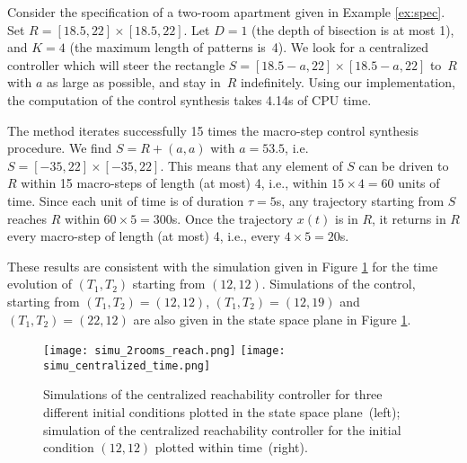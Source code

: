 \begin{example}
\label{ex:ex2}
Consider the specification of a two-room apartment given in Example
\ref{ex:spec}. Set $R=[18.5,22]\times[18.5,22]$.
Let $D=1$ (the depth of bisection is at most 1),
and $K=4$ (the maximum length of patterns is~4).
We look for a centralized controller which will steer
the rectangle $S=[18.5-a,22]\times [18.5-a,22]$
to~$R$ with $a$ as large as possible, and stay in~$R$ indefinitely.
Using our implementation, the computation of the control synthesis
takes 4.14s of CPU time.

The method iterates successfully 15 times the macro-step control synthesis procedure.
We find $S=R+(a,a)$ with $a=53.5$, i.e. $S=[-35,22]\times[-35,22]$.
This means that any element of $S$ can be driven to $R$ within 15 macro-steps
of length (at most) 4, i.e., within $15\times 4=60$
units of time. 
Since each unit of time is of duration
$\tau=5$s, any trajectory starting from $S$ reaches $R$ within $60\times 5=300$s.
Once the trajectory $x(t)$ is in $R$, it returns in $R$
every macro-step of length (at most) 4, i.e., every $4\times 5=20$s.

These results are consistent with the simulation
given in Figure \ref{fig:simu_centralized} for the time evolution
of $(T_1,T_2)$ starting from $(12,12)$.
Simulations of the control, starting from $(T_1,T_2)=(12,12)$,
$(T_1,T_2)=(12,19)$ and $(T_1,T_2)=(22,12)$
are also given in the state space plane
in Figure \ref{fig:simu_centralized}.
\begin{figure}[t]
  \centering
 \texttt{[image: simu\_2rooms\_reach.png]} 
\qquad
 \texttt{[image: simu\_centralized\_time.png]}

  \caption{Simulations of the centralized reachability controller for
    three different initial conditions plotted in the state space
    plane~(left); simulation of the centralized reachability
    controller for the initial condition $(12,12)$ plotted within
    time~(right).}
  \label{fig:simu_centralized}
\end{figure}
% 
% 
% 
 \end{example}


